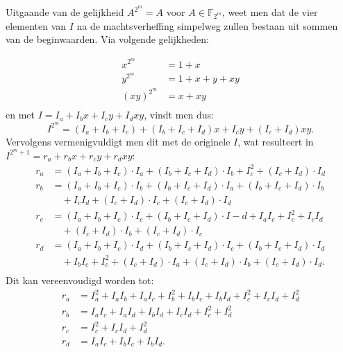 Uitgaande van de gelijkheid $A^{2^m} = A$ voor $A \in \mathbb{F}_{2^{m}}$, weet men dat de vier elementen van $I$ na de machtsverheffing simpelweg zullen bestaan uit sommen van de beginwaarden. Via volgende gelijkheden:

\[\begin{aligned}
x^{2^m}	&= 1 + x\\
y^{2^m}	&= 1 + x + y + xy\\
(xy)^{2^m}	&= x + xy\\
\end{aligned}\]
en met $I = I_a + I_b x + I_c y + I_d xy$, vindt men dus:
\[I^{2^m} = (I_a + I_b + I_c) + (I_b + I_c + I_d) x + I_c y + (I_c + I_d) xy.\]
Vervolgens vermenigvuldigt men dit met de originele $I$, wat resulteert in $I^{2^m + 1} = r_a + r_b x + r_c y + r_d xy$:
\[\begin{aligned}
r_a	&= (I_a + I_b + I_c) \cdot I_a + (I_b + I_c + I_d) \cdot I_b + I_c^2 + (I_c + I_d) \cdot I_d\\
r_b	&= (I_a + I_b + I_c) \cdot I_b + (I_b + I_c + I_d) \cdot I_a + (I_b + I_c + I_d) \cdot I_b\\
		&\quad + I_c I_d + (I_c + I_d) \cdot I_c + (I_c + I_d) \cdot I_d\\
r_c	&= (I_a + I_b + I_c) \cdot I_c + (I_b + I_c + I_d) \cdot I-d + I_a I_c + I_c^2 + I_c I_d\\
		&\quad + (I_c + I_d) \cdot I_b + (I_c + I_d) \cdot I_c\\
r_d	&= (I_a + I_b + I_c) \cdot I_d + (I_b + I_c + I_d) \cdot I_c + (I_b + I_c + I_d) \cdot I_d\\
		&\quad + I_b I_c + I_c^2 + (I_c + I_d) \cdot I_a + (I_c + I_d) \cdot I_b + (I_c + I_d) \cdot I_d.\\
\end{aligned}\]
Dit kan vereenvoudigd worden tot:
\[\begin{aligned}
r_a	&= I_a^2 + I_a I_b + I_a I_c + I_b^2 + I_b I_c + I_b I_d + I_c^2 + I_c I_d + I_d^2\\
r_b	&= I_a I_c + I_a I_d + I_b I_d + I_c I_d + I_c^2 + I_d^2\\
r_c	&= I_c^2 + I_c I_d + I_d^2\\
r_d	&= I_a I_c + I_b I_c + I_b I_d.\\
\end{aligned}\]

